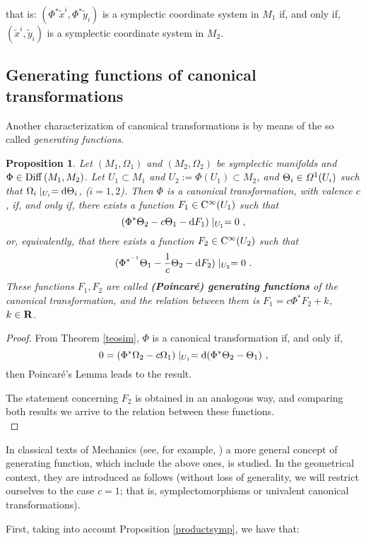 \documentclass[12pt]{report}
\newtheorem{prop}[teor]{Proposition}
\def\qed{\ifvmode\removelastskip\fi
{\unskip\nobreak\hfil\penalty50\hbox{}\nobreak\hfil
\hbox{\vrule height1.2ex width1.2ex}\parfillskip=0pt
\finalhyphendemerits=0 \par\smallskip}}
\def\d{{\rm d}}
\def\Cinfty{{\rm C}^\infty}
\begin{document}
\noindent that is: $(\Phi^*\tilde  x^i,\Phi^*\tilde  y_i)$ is a symplectic coordinate system in $M_{1}$ if, and only if, $(\tilde  x^i,\tilde  y_i)$ is a symplectic coordinate system in $M_{2}$. 


\subsection{Generating functions of canonical transformations}


Another characterization of canonical transformations
is by means of the so called  {\sl generating functions}.

\begin{prop}
Let $(M_1,\Omega_1)$ and $(M_2,\Omega_2)$ be
symplectic manifolds and $\Phi \in {\rm Diff}\,  (M_1,M_2)$.
Let $U_1 \subset M_1$ and $U_2 :=\Phi (U_1) \subset M_2$, and
$\Theta_i \in {\mit\Omega}^1(U_i)$ such that
$\Omega_i\mid_{U_i} = \d \Theta_i$, ($i=1,2$).
Then $\Phi$ is
a canonical transformation, with valence $c$, if, and only if,
there exists a function $F_1 \in \Cinfty (U_1)$ such that
$$
(\Phi^*\Theta_2 - c\Theta_1 - \d F_1)\mid_{U_1} = 0 \ ,
$$
or, equivalently, that there exists a function $F_2 \in \Cinfty (U_2)$
such that
$$
(\Phi^{*^{-1}}\Theta_1 - \frac{1}{c}\Theta_2 - \d F_2)\mid_{U_2} = 0 \ .
$$
These functions $F_1,F_2$ are called {\sl \textbf{(Poincar\'e) generating functions}}
of the canonical transformation, and the relation between them is 
$F_1 = c\Phi^*F_2 + k$, $k \in {\bf R}$.
\end{prop}
\begin{proof}
From Theorem \ref{teosim},
$\Phi$ is a canonical transformation if, and only if,
$$
0 = (\Phi^*\Omega_2 - c\Omega_1)\mid_{U_1} = \d (\Phi^*\Theta_2 - \Theta_1) \ ,
$$
then Poincar\'e's Lemma leads to the result.

The statement concerning $F_2$ is obtained in an analogous way,
and comparing both results we arrive to the relation between these functions.
\\ \qed  \end{proof}

In classical texts of Mechanics (see, for example, \cite{Ga-70, LL-76, GPS-01}) a more general concept
of generating function, which include the above ones, is studied. 
In the geometrical context, they are introduced as follows
 \cite{AM-78}
(without loss of generality, we will restrict ourselves to the case $c=1$;
that is, symplectomorphisms or univalent canonical transformations).

First, taking into account Proposition \ref{productsymp}, we have that:
\end{document}
